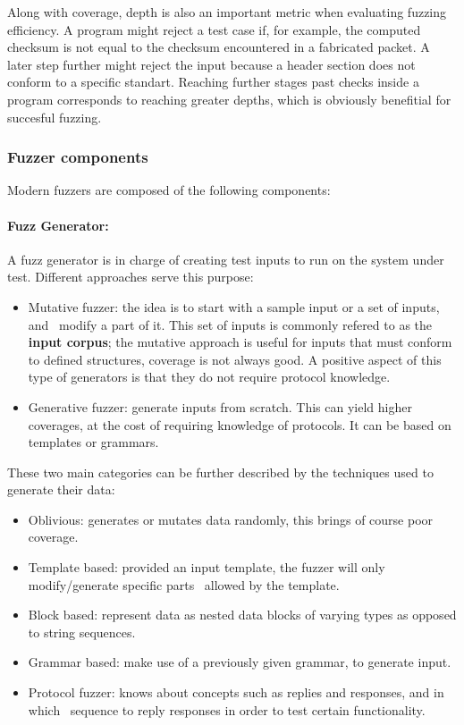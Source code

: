 Along with coverage, depth is also an important metric when evaluating fuzzing efficiency. A program
might reject a test case if, for example, the computed checksum is not equal to the checksum encountered
in a fabricated packet. A later step further might reject the input because a header section does not conform
to a specific standart. Reaching further stages past  checks inside a program corresponds to reaching greater
depths, which is obviously benefitial for succesful fuzzing.

\subsubsection{Fuzzer components}

Modern fuzzers are composed of the following components:

\paragraph{Fuzz Generator:}

A fuzz generator is in charge of creating test inputs to run on the system under test. Different
approaches serve this purpose\cite{mcnallyFuzzingStateArt2012}:

\begin{itemize}\label{ss:fuzzer-components}
    \item Mutative fuzzer: the idea is to start with a sample input or a set of inputs, and \
    modify a part of it. This set of inputs is commonly refered to as the \textbf{input corpus}; the mutative approach is useful for inputs that must conform to defined structures, coverage is not
    always good. A positive aspect of this type of generators is that they do not require protocol knowledge.
    \item Generative fuzzer: generate inputs from scratch. This can yield higher coverages, at the cost of requiring
    knowledge of protocols. It can be based on templates or grammars.
\end{itemize}

These two main categories can be further described by the techniques used to generate their data:

\begin{itemize}
    \item Oblivious: generates or mutates data randomly, this brings of course poor coverage.
    \item Template based: provided an input template, the fuzzer will only modify/generate specific parts \
    allowed by the template.
    \item Block based: represent data as nested data blocks of varying types as opposed to string sequences.
    \item Grammar based: make use of a previously given grammar, to generate input.
    \item Protocol fuzzer: knows about concepts such as replies and responses, and in which \
    sequence to reply responses in order to test certain functionality.
\end{itemize}

